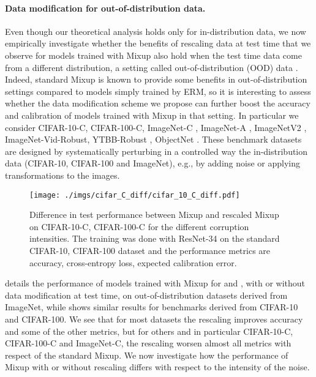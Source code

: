 \documentclass[twoside,11pt]{article}
\begin{document}
\paragraph{Data modification for out-of-distribution data.} 
Even though our theoretical analysis holds only for in-distribution data, we now empirically investigate whether the benefits of rescaling data at test time that we observe for models trained with Mixup also hold when the test time data come from a different distribution, a setting called out-of-distribution (OOD) data \citep{hendrycks2016baseline}. Indeed, standard Mixup is known to provide some benefits in out-of-distribution settings compared to models simply trained by ERM, so it is interesting to assess whether the data modification scheme we propose can further boost the accuracy and calibration of models trained with Mixup in that setting.
In particular we consider CIFAR-10-C, CIFAR-100-C, ImageNet-C \citep{hendrycks2019robustness}, ImageNet-A \citep{hendrycks2019natural}, 
ImageNetV2 \citep{recht2019imagenet}, ImageNet-Vid-Robust, YTBB-Robust \citep{shankar2019image}, 
ObjectNet \citep{barbu2019objectnet}. 
These benchmark datasets are designed by systematically perturbing in a controlled way 
the in-distribution data (CIFAR-10, CIFAR-100 and ImageNet), e.g., 
by adding noise or applying transformations to the images.
\begin{figure}[ht]
    \texttt{[image: ./imgs/cifar\_C\_diff/cifar\_10\_C\_diff.pdf]}
    \caption{\small{Difference in test performance between Mixup and rescaled Mixup on CIFAR-10-C, CIFAR-100-C for the different corruption intensities. 
    The training was done with ResNet-34 on the standard CIFAR-10, CIFAR-100 dataset and the performance metrics are accuracy, cross-entropy loss, expected calibration error.}}\label{fig:diff-rescaling_mixup}
\end{figure} 
 details the performance of models trained with Mixup for  and , with or without data modification at test time, on out-of-distribution datasets derived from ImageNet, while  shows similar results for benchmarks derived from CIFAR-10 and CIFAR-100. We see that for most datasets the rescaling improves accuracy and some of the other metrics, 
but for others and in particular CIFAR-10-C, CIFAR-100-C and ImageNet-C, the rescaling worsen almost all metrics with respect of the standard Mixup.
We now investigate how the performance of Mixup with or without rescaling differs with respect to the intensity of the noise.
\end{document}
